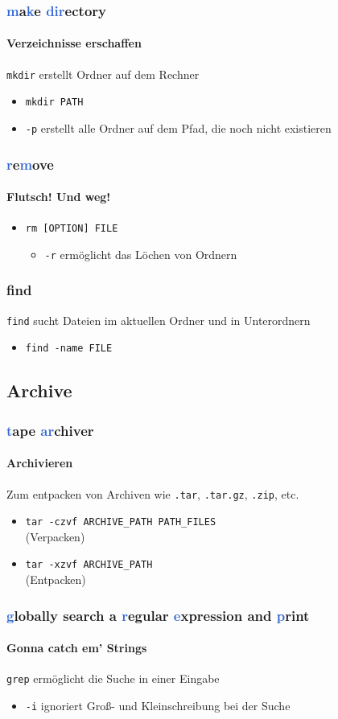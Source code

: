 \documentclass[12pt,utf8]{beamer}
\begin{document}
\begin{frame}
\frametitle{\textcolor{highlight}{m}a\textcolor{highlight}{k}e \textcolor{highlight}{dir}ectory}
\framesubtitle{Verzeichnisse erschaffen}
\texttt{mkdir} erstellt Ordner auf dem Rechner
\begin{itemize}
	\item \texttt{mkdir PATH}
	\item \texttt{-p} erstellt alle Ordner auf dem Pfad, die noch nicht existieren
\end{itemize}
\end{frame}

\begin{frame}
\frametitle{\textcolor{highlight}{r}e\textcolor{highlight}{m}ove}
\framesubtitle{Flutsch! Und weg!}
\begin{itemize}
	\item \texttt{rm [OPTION] FILE}
	\begin{itemize}[<+->]
		\item \texttt{-r} ermöglicht das Löchen von Ordnern
	\end{itemize}
\end{itemize}
\end{frame}

\begin{frame}
	\frametitle{find}
	\texttt{find} sucht Dateien im aktuellen Ordner und in Unterordnern
	\begin{itemize}
		\item \texttt{find -name FILE}
	\end{itemize}
\end{frame}

\subsection{Archive}
\begin{frame}
\frametitle{\textcolor{highlight}{t}ape \textcolor{highlight}{ar}chiver}
\framesubtitle{Archivieren}
Zum entpacken von Archiven wie \texttt{.tar}, \texttt{.tar.gz}, \texttt{.zip}, etc. 
\begin{itemize}
	\item \texttt{tar -czvf ARCHIVE\_PATH PATH\_FILES}\\(Verpacken)
	\item \texttt{tar -xzvf ARCHIVE\_PATH}\\(Entpacken)
\end{itemize}
\end{frame}

\begin{frame}
\frametitle{\Large{\textcolor{highlight}{g}lobally search a \textcolor{highlight}{r}egular \textcolor{highlight}{e}xpression and \textcolor{highlight}{p}rint}}
\framesubtitle{Gonna catch em' Strings}
\texttt{grep} ermöglicht die Suche in einer Eingabe
\begin{itemize}
	\item \texttt{-i} ignoriert Groß- und Kleinschreibung bei der Suche
\end{itemize}
\end{frame}
\end{document}
